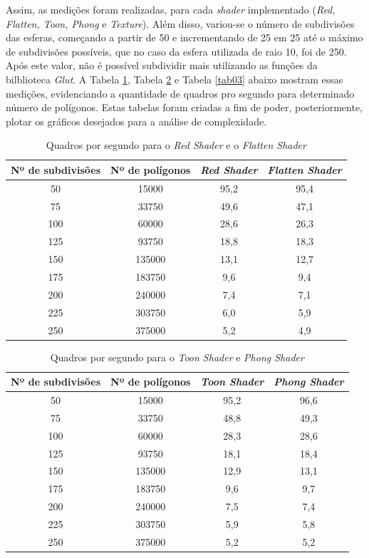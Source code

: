 	Assim, as medições foram realizadas, para cada \textit{shader} implementado (\textit{Red, Flatten, Toon, Phong} e  \textit{Texture}). Além disso, variou-se o número de subdivisões das esferas, começando a partir de 50 e incrementando de 25 em 25 até o máximo de subdivisões possíveis, que no caso da esfera utilizada de raio 10, foi de 250. Após este valor, não é possível subdividir mais utilizando as funções da bilblioteca \textit{Glut}. A Tabela \ref{tab01}, Tabela \ref{tab02} e Tabela \ref{tab03} abaixo mostram essas medições, evidenciando a quantidade de quadros pro segundo para determinado número de polígonos.  Estas tabelas foram criadas a fim de poder, posteriormente, plotar os gráficos desejados para a análise de complexidade. 

\begin{table}[h]
	\centering
	\begin{tabular}{cccc}
		\toprule
		\textbf{Nº de subdivisões} & \textbf{Nº de polígonos} 
		& \textbf{\textit{Red Shader}} & \textbf{\textit{Flatten Shader}} \\
		\midrule
		50 & 15000 & 95,2 & 95,4 \\
		75 & 33750 & 49,6  & 47,1\\
		100 & 60000 & 28,6 & 26,3 \\
		125 & 93750 & 18,8  & 18,3 \\
		150 & 135000 & 13,1 & 12,7 \\
		175 & 183750 & 9,6 & 9,4 \\
		200 & 240000 & 7,4 & 7,1 \\
		225 & 303750 & 6,0 & 5,9 \\
		250 & 375000 & 5,2 & 4,9 \\
		\bottomrule
	\end{tabular}
	\caption{Quadros por segundo para o \textit{Red Shader} e o \textit{Flatten Shader}}
	\label{tab01}
\end{table}

\begin{table}[h]
	\centering	
	\begin{tabular}{cccc}
		\toprule
		\textbf{Nº de subdivisões} & \textbf{Nº de polígonos} & 
		\textbf{\textit{Toon Shader}} & \textbf{\textit{Phong Shader}}  \\
		\midrule
		50 & 15000 & 95,2  & 96,6\\
		75 & 33750 & 48,8  & 49,3\\
		100 & 60000 &  28,3 & 28,6\\
		125 & 93750 & 18,1 & 18,4\\
		150 & 135000 &  12,9 & 13,1\\
		175 & 183750 &  9,6 & 9,7\\
		200 & 240000 &  7,5 & 7,4\\
		225 & 303750 &  5,9 & 5,8\\
		250 & 375000 &  5,2 & 5,2\\
		\bottomrule
	\end{tabular}
	\caption{Quadros por segundo para o \textit{Toon Shader} e \textit{Phong Shader}}
	\label{tab02}
\end{table}

